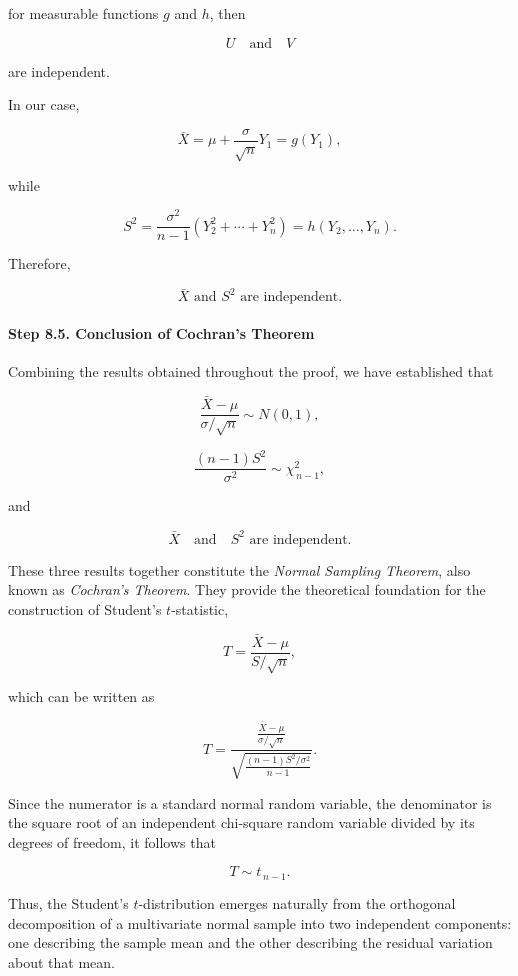 \documentclass[11pt]{article}
\begin{document}
\begin{mdframed}[
		linewidth=0.8pt,
		roundcorner=6pt,
		backgroundcolor=gray!5,
		linecolor=gray!60,
		innertopmargin=10pt,
		innerbottommargin=10pt,
		innerleftmargin=10pt,
		innerrightmargin=10pt
		]
		for measurable functions \(g\) and \(h\), then
		
		\[
		U
		\quad\text{and}\quad
		V
		\]
		
		are independent.
		
		In our case,
		
		\[
		\bar X
		=
		\mu
		+
		\frac{\sigma}{\sqrt n}Y_1
		=
		g(Y_1),
		\]
		
		while
		
		\[
		S^2
		=
		\frac{\sigma^2}{n-1}
		\left(
		Y_2^2+\cdots+Y_n^2
		\right)
		=
		h(Y_2,\ldots,Y_n).
		\]
		
		Therefore,
		
		\[
		\boxed{
			\bar X
			\text{ and }
			S^2
			\text{ are independent.}
		}
		\]
		
		\paragraph{Step 8.5. Conclusion of Cochran's Theorem}
		
		Combining the results obtained throughout the proof, we have established
		that
		
		\[
		\boxed{
			\frac{\bar X-\mu}
			{\sigma/\sqrt n}
			\sim
			N(0,1),
		}
		\]
		
		\[
		\boxed{
			\frac{(n-1)S^2}{\sigma^2}
			\sim
			\chi^2_{\,n-1},
		}
		\]
		
		and
		
		\[
		\boxed{
			\bar X
			\quad\text{and}\quad
			S^2
			\text{ are independent.}
		}
		\]
		
		These three results together constitute the \emph{Normal Sampling Theorem},
		also known as \emph{Cochran's Theorem}. They provide the theoretical
		foundation for the construction of Student's \(t\)-statistic,
		
		\[
		T
		=
		\frac{\bar X-\mu}
		{S/\sqrt n},
		\]
		
		which can be written as
		
		\[
		T
		=
		\frac{
			\displaystyle
			\frac{\bar X-\mu}
			{\sigma/\sqrt n}
		}{
			\displaystyle
			\sqrt{
				\frac{(n-1)S^2/\sigma^2}
				{n-1}
			}
		}.
		\]
		
		Since the numerator is a standard normal random variable, the denominator
		is the square root of an independent chi-square random variable divided by
		its degrees of freedom, it follows that
		
		\[
		\boxed{
			T
			\sim
			t_{\,n-1}.
		}
		\]
		
		Thus, the Student's \(t\)-distribution emerges naturally from the
		orthogonal decomposition of a multivariate normal sample into two
		independent components: one describing the sample mean and the other
		describing the residual variation about that mean.
		
	\end{mdframed}
	
\end{document}
